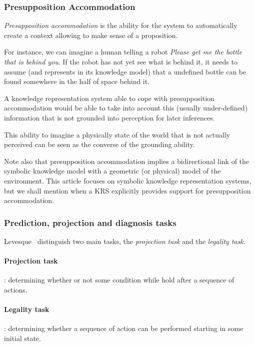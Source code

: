 \subsubsection{Presupposition Accommodation}
\label{sect|presupposition-accommodation}

\emph{Presupposition accommodation} is the ability for the system to
automatically create a context allowing to make sense of a proposition.

For instance, we can imagine a human telling a robot \emph{Please get me the
bottle that is behind you}. If the robot has not yet see what is behind it, it
needs to assume (and represents in its knowledge model) that a undefined bottle
can be found somewhere in the half of space behind it.

A knowledge representation system able to cope with presupposition
accommodation would be able to take into account this (usually under-defined)
information that is not grounded into perception for later inferences.

This ability to imagine a physically state of the world that is not actually
perceived can be seen as the converse of the grounding ability.

Note also that presupposition accommodation implies a bidirectional link of the
symbolic knowledge model with a geometric (or physical) model of the
environment. This article focuses on symbolic knowledge representation systems,
but we shall mention when a KRS explicitly provides support for presupposition
accommodation.

\subsubsection{Prediction, projection and diagnosis tasks}
\label{sect|prediction-projection}

Levesque~\cite{Levesque2008} distinguish two main tasks, the \emph{projection
task} and the \emph{legality task}.

\paragraph{Projection task}: determining whether or not some condition while
hold after a sequence of actions.

\paragraph{Legality task}: determining whether a sequence of action can be
performed starting in some initial state.

